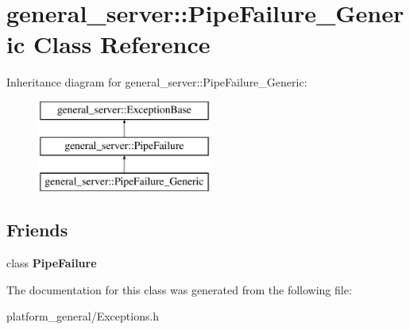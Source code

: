 \hypertarget{classgeneral__server_1_1PipeFailure__Generic}{\section{general\-\_\-server\-:\-:\-Pipe\-Failure\-\_\-\-Generic \-Class \-Reference}
\label{classgeneral__server_1_1PipeFailure__Generic}
}
\-Inheritance diagram for general\-\_\-server\-:\-:\-Pipe\-Failure\-\_\-\-Generic\-:\begin{figure}[H]
\begin{center}
\leavevmode
\includegraphics[height=3.000000cm]{classgeneral__server_1_1PipeFailure__Generic}
\end{center}
\end{figure}
\subsection*{\-Friends}
\begin{DoxyCompactItemize}
\item 
\hypertarget{classgeneral__server_1_1PipeFailure__Generic_a6b35978698e89f7e3f63b6db5a5366b6}{class {\bfseries \-Pipe\-Failure}}\label{classgeneral__server_1_1PipeFailure__Generic_a6b35978698e89f7e3f63b6db5a5366b6}

\end{DoxyCompactItemize}


\-The documentation for this class was generated from the following file\-:\begin{DoxyCompactItemize}
\item 
platform\-\_\-general/\-Exceptions.\-h\end{DoxyCompactItemize}
